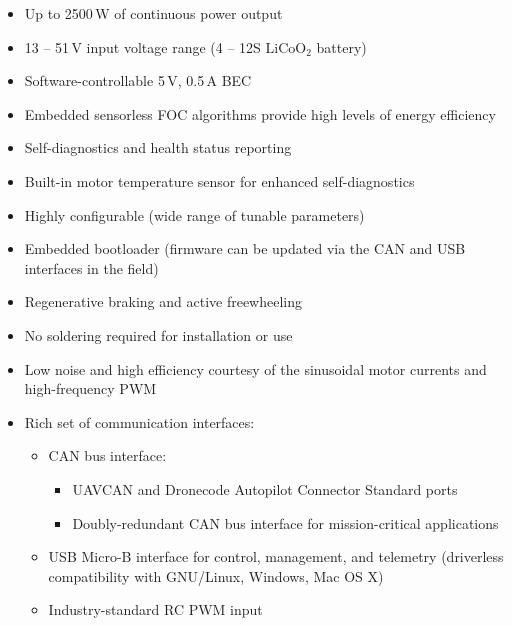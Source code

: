 \documentclass{zubaxdoc}
\begin{document}
\begin{titlepage}
\begin{itemize}[leftmargin=!,labelindent=!,itemindent=0pt]
    \item Up to 2500\,W of continuous power output
    \item 13 -- 51\,V input voltage range (4 -- 12S $\text{LiCoO}_\text{2}$ battery)
    \item Software-controllable 5\,V, 0.5\,A BEC
    \item Embedded sensorless FOC algorithms provide high levels of energy efficiency
    \item Self-diagnostics and health status reporting
    \item Built-in motor temperature sensor for enhanced self-diagnostics
    \item Highly configurable (wide range of tunable parameters)
    \item Embedded bootloader (firmware can be updated via the CAN and USB interfaces in the field)
    \item Regenerative braking and active freewheeling
    \item No soldering required for installation or use
    \item Low noise and high efficiency courtesy of the sinusoidal motor currents and high-frequency PWM
    \item Rich set of communication interfaces:
     \begin{itemize}[label=--,itemindent=0pt]
        \item CAN bus interface:
        \begin{itemize}[label=*,leftmargin=8pt,itemindent=0pt]
            \item UAVCAN and Dronecode Autopilot Connector Standard ports
            \item Doubly-redundant CAN bus interface for mission-critical applications
        \end{itemize}
        \item USB Micro-B interface for control, management, and telemetry (driverless compatibility
              with GNU/Linux, Windows, Mac OS X)
        \item Industry-standard RC PWM input
    \end{itemize}
\end{itemize}


\end{titlepage}
\end{document}
